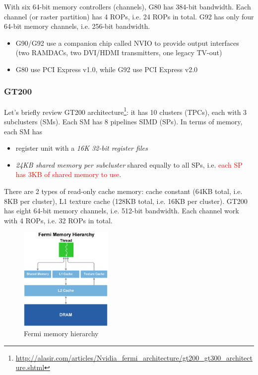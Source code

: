 With six 64-bit memory controllers (channels), G80 has 384-bit
bandwidth. Each channel (or raster partition) has 4 ROPs, i.e. 24 ROPs
in total. G92 has only four 64-bit memory channels, i.e. 256-bit
bandwidth.

\begin{itemize}
\item G90/G92 use a companion chip called NVIO to provide output
  interfaces (two RAMDACs, two DVI/HDMI transmitters, one legacy
  TV-out)
\item G80 use PCI Express v1.0, while G92 use PCI Express v2.0
\end{itemize}

\subsubsection{GT200}
\label{sec:gt200}

Let's briefly review GT200
architecture\footnote{\url{http://alasir.com/articles/Nvidia_fermi_architecture/gt200_gt300_architecture.shtml}}:
it has 10 clusters (TPCs), each with 3 subclusters (SMs). Each SM has
8 pipelines SIMD (SPs).  In terms of memory, each SM has
\begin{itemize}
\item register unit with a {\it 16K 32-bit register files}

\item {\it 24KB shared memory per subcluster} shared equally to all
  SPs, i.e.  \textcolor{red}{each SP has 3KB of shared memory to use}.
\end{itemize}
There are 2 types of read-only cache memory: cache constant (64KB
total, i.e. 8KB per cluster), L1 texture cache (128KB total, i.e. 16KB
per cluster).  GT200 has eight 64-bit memory channels, i.e. 512-bit
bandwidth. Each channel work with 4 ROPs, i.e. 32 ROPs in total.

\begin{figure}[hbt]
  \centerline{\includegraphics[height=5cm,
    angle=0]{./images/fermi_memory1.eps}}
  \caption{Fermi memory hierarchy}
  \label{fig:fermi_memory}
\end{figure}


